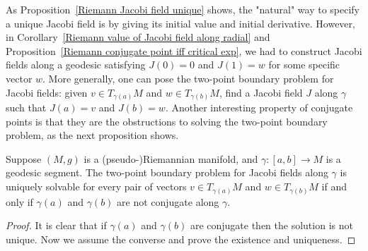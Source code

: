 As Proposition~\ref{Riemann Jacobi field unique} shows, the "natural" way to specify a unique Jacobi field is by giving its initial value and initial derivative. However, 
in Corollary~\ref{Riemann value of Jacobi field along radial} and Proposition~\ref{Riemann conjugate point iff critical exp}, we had to construct Jacobi fields along a 
geodesic satisfying $J(0)=0$ and $J(1)=w$ for some specific vector $w$. More generally, one can pose the two-point boundary problem for Jacobi fields: given 
$v\in T_{\gamma(a)}M$ and $w\in T_{\gamma(b)}M$, find a Jacobi field $J$ along $\gamma$ such that $J(a)=v$ and $J(b)=w$. Another interesting property of conjugate 
points is that they are the obstructions to solving the two-point boundary problem, as the next proposition shows.
\begin{proposition}
Suppose $(M,g)$ is a (pseudo-)Riemannian manifold, and $\gamma:[a,b]\to M$ is a geodesic segment. The two-point boundary problem for Jacobi fields along 
$\gamma$ is uniquely solvable for every pair of vectors $v\in T_{\gamma(a)}M$ and $w\in T_{\gamma(b)}M$ if and only if $\gamma(a)$ and $\gamma(b)$ are not conjugate 
along $\gamma$.
\end{proposition}
\begin{proof}
It is clear that if $\gamma(a)$ and $\gamma(b)$ are conjugate then the solution is not unique. Now we assume the converse and prove the existence and uniqueness.
\end{proof}
